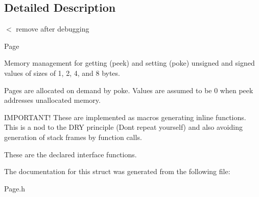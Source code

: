 \subsection{Detailed Description}
$<$ remove after debugging 

Page

Memory management for getting (peek) and setting (poke) unsigned and signed values of sizes of 1, 2, 4, and 8 bytes.

Pages are allocated on demand by poke. Values are assumed to be 0 when peek addresses unallocated memory.

I\+M\+P\+O\+R\+T\+A\+N\+T! These are implemented as macros generating inline functions. This is a nod to the D\+R\+Y principle (Don\textquotesingle{}t repeat yourself) and also avoiding generation of stack frames by function calls.

These are the declared interface functions. 

The documentation for this struct was generated from the following file\+:\begin{DoxyCompactItemize}
\item 
Page.\+h\end{DoxyCompactItemize}
